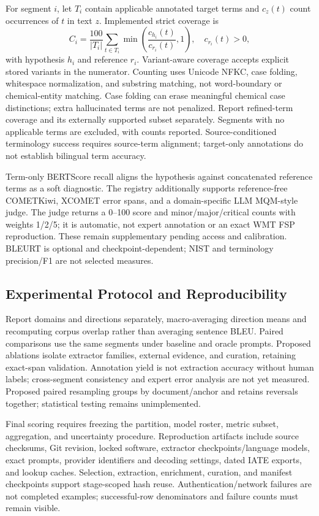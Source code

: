 \documentclass[11pt]{article}
\begin{document}
For segment $i$, let $T_i$ contain applicable annotated target terms and $c_z(t)$ count occurrences
of $t$ in text $z$. Implemented strict coverage is
\begin{equation}
 C_i=\frac{100}{|T_i|}\sum_{t\in T_i}
 \min\left(\frac{c_{h_i}(t)}{c_{r_i}(t)},1\right),\quad c_{r_i}(t)>0,
\end{equation}
with hypothesis $h_i$ and reference $r_i$. Variant-aware coverage accepts explicit stored variants
in the numerator. Counting uses Unicode NFKC, case folding, whitespace normalization, and substring
matching, not word-boundary or chemical-entity matching. Case folding can erase meaningful chemical
case distinctions; extra hallucinated terms are not penalized. Report refined-term coverage and
its externally supported subset separately. Segments with no applicable terms are excluded, with
counts reported. Source-conditioned terminology success requires source-term alignment; target-only
annotations do not establish bilingual term accuracy.

Term-only BERTScore recall aligns the hypothesis against concatenated reference terms as a soft
diagnostic. The registry additionally supports reference-free COMETKiwi, XCOMET error spans, and a
domain-specific LLM MQM-style judge. The judge returns a 0--100 score and minor/major/critical
counts with weights 1/2/5; it is automatic, not expert annotation or an exact WMT FSP reproduction.
These remain supplementary pending access and calibration. BLEURT is optional and checkpoint-dependent;
NIST and terminology precision/F1 are not selected measures.

\subsection{Experimental Protocol and Reproducibility}
\label{sec:protocol}

Report domains and directions separately, macro-averaging direction means and recomputing corpus
overlap rather than averaging sentence BLEU. Paired comparisons use the same segments under baseline
and oracle prompts. Proposed ablations isolate extractor families, external evidence, and curation,
retaining exact-span validation. Annotation yield is not extraction accuracy without human labels;
cross-segment consistency and expert error analysis are not yet measured. Proposed paired resampling
groups by document/anchor and retains reversals together; statistical testing remains unimplemented.

Final scoring requires freezing the partition, model roster, metric subset, aggregation, and
uncertainty procedure. Reproduction artifacts include source checksums, Git revision, locked software,
extractor checkpoints/language models, exact prompts, provider identifiers and decoding settings,
dated IATE exports, and lookup caches. Selection, extraction, enrichment, curation, and manifest
checkpoints support stage-scoped hash reuse. Authentication/network failures are not completed
examples; successful-row denominators and failure counts must remain visible.
\end{document}
